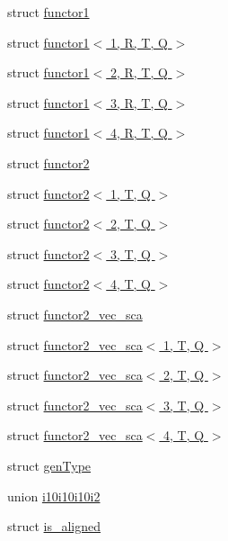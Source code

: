 \begin{DoxyCompactItemize}
struct \hyperlink{structglm_1_1detail_1_1functor1}{functor1}
\item 
struct \hyperlink{structglm_1_1detail_1_1functor1_3_011_00_01_r_00_01_t_00_01_q_01_4}{functor1$<$ 1, R, T, Q $>$}
\item 
struct \hyperlink{structglm_1_1detail_1_1functor1_3_012_00_01_r_00_01_t_00_01_q_01_4}{functor1$<$ 2, R, T, Q $>$}
\item 
struct \hyperlink{structglm_1_1detail_1_1functor1_3_013_00_01_r_00_01_t_00_01_q_01_4}{functor1$<$ 3, R, T, Q $>$}
\item 
struct \hyperlink{structglm_1_1detail_1_1functor1_3_014_00_01_r_00_01_t_00_01_q_01_4}{functor1$<$ 4, R, T, Q $>$}
\item 
struct \hyperlink{structglm_1_1detail_1_1functor2}{functor2}
\item 
struct \hyperlink{structglm_1_1detail_1_1functor2_3_011_00_01_t_00_01_q_01_4}{functor2$<$ 1, T, Q $>$}
\item 
struct \hyperlink{structglm_1_1detail_1_1functor2_3_012_00_01_t_00_01_q_01_4}{functor2$<$ 2, T, Q $>$}
\item 
struct \hyperlink{structglm_1_1detail_1_1functor2_3_013_00_01_t_00_01_q_01_4}{functor2$<$ 3, T, Q $>$}
\item 
struct \hyperlink{structglm_1_1detail_1_1functor2_3_014_00_01_t_00_01_q_01_4}{functor2$<$ 4, T, Q $>$}
\item 
struct \hyperlink{structglm_1_1detail_1_1functor2__vec__sca}{functor2\+\_\+vec\+\_\+sca}
\item 
struct \hyperlink{structglm_1_1detail_1_1functor2__vec__sca_3_011_00_01_t_00_01_q_01_4}{functor2\+\_\+vec\+\_\+sca$<$ 1, T, Q $>$}
\item 
struct \hyperlink{structglm_1_1detail_1_1functor2__vec__sca_3_012_00_01_t_00_01_q_01_4}{functor2\+\_\+vec\+\_\+sca$<$ 2, T, Q $>$}
\item 
struct \hyperlink{structglm_1_1detail_1_1functor2__vec__sca_3_013_00_01_t_00_01_q_01_4}{functor2\+\_\+vec\+\_\+sca$<$ 3, T, Q $>$}
\item 
struct \hyperlink{structglm_1_1detail_1_1functor2__vec__sca_3_014_00_01_t_00_01_q_01_4}{functor2\+\_\+vec\+\_\+sca$<$ 4, T, Q $>$}
\item 
struct \hyperlink{structglm_1_1detail_1_1gen_type}{gen\+Type}
\item 
union \hyperlink{unionglm_1_1detail_1_1i10i10i10i2}{i10i10i10i2}
\item 
struct \hyperlink{structglm_1_1detail_1_1is__aligned}{is\+\_\+aligned}

\end{DoxyCompactItemize}
